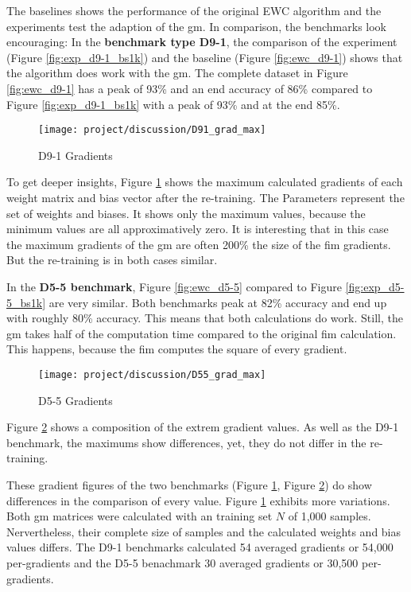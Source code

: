 The baselines shows the performance of the original EWC algorithm and the experiments test the adaption of the \acrlong{gm}.
In comparison, the benchmarks look encouraging:
\newline
In the \textbf{benchmark type D9-1}, the comparison of the experiment (Figure \ref{fig:exp_d9-1_bs1k}) and the baseline (Figure \ref{fig:ewc_d9-1}) shows that the algorithm does work with the \acrshort{gm}.
The complete dataset in Figure \ref{fig:ewc_d9-1} has a peak of 93\% and an end accuracy of 86\% compared to Figure \ref{fig:exp_d9-1_bs1k} with a peak of 93\% and at the end 85\%.

\begin{figure}[H]
    \centering
    \texttt{[image: project/discussion/D91\_grad\_max]}
    \caption{D9-1 Gradients}
    \label{fig:dis_d91}
\end{figure}

To get deeper insights, Figure \ref{fig:dis_d91} shows the maximum calculated gradients of each weight matrix and bias vector after the re-training.
The Parameters represent the set of weights and biases.
It shows only the maximum values, because the minimum values are all approximatively zero.
It is interesting that in this case the maximum gradients of the \acrshort{gm} are often 200\% the size of the \acrshort{fim} gradients.
But the re-training is in both cases similar.

In the \textbf{D5-5 benchmark}, Figure \ref{fig:ewc_d5-5} compared to Figure \ref{fig:exp_d5-5_bs1k} are very similar.
Both benchmarks peak at 82\% accuracy and end up with roughly 80\% accuracy.
This means that both calculations do work.
Still, the \acrshort{gm} takes half of the computation time compared to the original \acrshort{fim} calculation.
This happens, because the \acrshort{fim} computes the square of every gradient.

\begin{figure}[H]
    \centering
    \texttt{[image: project/discussion/D55\_grad\_max]}
    \caption{D5-5 Gradients}
    \label{fig:dis_d55}
\end{figure}

Figure \ref{fig:dis_d55} shows a composition of the extrem gradient values.
As well as the D9-1 benchmark, the maximums show differences, yet, they do not differ in the re-training.

These gradient figures of the two benchmarks (Figure \ref{fig:dis_d91}, Figure \ref{fig:dis_d55}) do show differences in the comparison of every value.
Figure \ref{fig:dis_d91} exhibits more variations.
Both \acrshort{gm} matrices were calculated with an training set $N$ of 1,000 samples.
Nervertheless, their complete size of samples and the calculated weights and bias values differs.
The D9-1 benchmarks calculated 54 averaged gradients or 54,000 per-gradients and the D5-5 benachmark 30 averaged gradients or 30,500 per-gradients.

